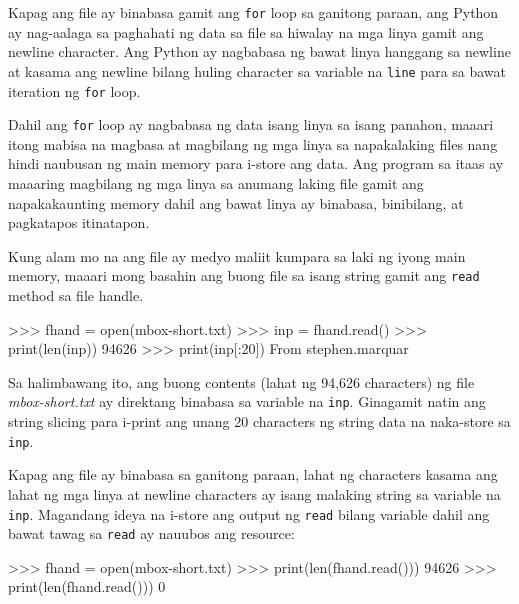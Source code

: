 \documentclass[10pt,]{book}
\newenvironment{Shaded}{}{}
\newcommand{\BuiltInTok}[1]{\textcolor[rgb]{0.00,0.50,0.00}{#1}}
\newcommand{\DecValTok}[1]{\textcolor[rgb]{0.25,0.63,0.44}{#1}}
\newcommand{\NormalTok}[1]{#1}
\newcommand{\OperatorTok}[1]{\textcolor[rgb]{0.40,0.40,0.40}{#1}}
\newcommand{\StringTok}[1]{\textcolor[rgb]{0.25,0.44,0.63}{#1}}
\begin{document}
Kapag ang file ay binabasa gamit ang \texttt{for} loop sa ganitong
paraan, ang Python ay nag-aalaga sa paghahati ng data sa file sa hiwalay
na mga linya gamit ang newline character. Ang Python ay nagbabasa ng
bawat linya hanggang sa newline at kasama ang newline bilang huling
character sa variable na \texttt{line} para sa bawat iteration ng
\texttt{for} loop.

Dahil ang \texttt{for} loop ay nagbabasa ng data isang linya sa isang
panahon, maaari itong mabisa na magbasa at magbilang ng mga linya sa
napakalaking files nang hindi naubusan ng main memory para i-store ang
data. Ang program sa itaas ay maaaring magbilang ng mga linya sa anumang
laking file gamit ang napakakaunting memory dahil ang bawat linya ay
binabasa, binibilang, at pagkatapos itinatapon.

Kung alam mo na ang file ay medyo maliit kumpara sa laki ng iyong main
memory, maaari mong basahin ang buong file sa isang string gamit ang
\texttt{read} method sa file handle.

\begin{Shaded}
\begin{Highlighting}[]
\OperatorTok{\textgreater{}\textgreater{}\textgreater{}}\NormalTok{ fhand }\OperatorTok{=} \BuiltInTok{open}\NormalTok{(}\StringTok{\textquotesingle{}mbox{-}short.txt\textquotesingle{}}\NormalTok{)}
\OperatorTok{\textgreater{}\textgreater{}\textgreater{}}\NormalTok{ inp }\OperatorTok{=}\NormalTok{ fhand.read()}
\OperatorTok{\textgreater{}\textgreater{}\textgreater{}} \BuiltInTok{print}\NormalTok{(}\BuiltInTok{len}\NormalTok{(inp))}
\DecValTok{94626}
\OperatorTok{\textgreater{}\textgreater{}\textgreater{}} \BuiltInTok{print}\NormalTok{(inp[:}\DecValTok{20}\NormalTok{])}
\NormalTok{From stephen.marquar}
\end{Highlighting}
\end{Shaded}

Sa halimbawang ito, ang buong contents (lahat ng 94,626 characters) ng
file \emph{mbox-short.txt} ay direktang binabasa sa variable na
\texttt{inp}. Ginagamit natin ang string slicing para i-print ang unang
20 characters ng string data na naka-store sa \texttt{inp}.

Kapag ang file ay binabasa sa ganitong paraan, lahat ng characters
kasama ang lahat ng mga linya at newline characters ay isang malaking
string sa variable na \texttt{inp}. Magandang ideya na i-store ang
output ng \texttt{read} bilang variable dahil ang bawat tawag sa
\texttt{read} ay nauubos ang resource:

\begin{Shaded}
\begin{Highlighting}[]
\OperatorTok{\textgreater{}\textgreater{}\textgreater{}}\NormalTok{ fhand }\OperatorTok{=} \BuiltInTok{open}\NormalTok{(}\StringTok{\textquotesingle{}mbox{-}short.txt\textquotesingle{}}\NormalTok{)}
\OperatorTok{\textgreater{}\textgreater{}\textgreater{}} \BuiltInTok{print}\NormalTok{(}\BuiltInTok{len}\NormalTok{(fhand.read()))}
\DecValTok{94626}
\OperatorTok{\textgreater{}\textgreater{}\textgreater{}} \BuiltInTok{print}\NormalTok{(}\BuiltInTok{len}\NormalTok{(fhand.read()))}
\DecValTok{0}
\end{Highlighting}
\end{Shaded}
\end{document}
